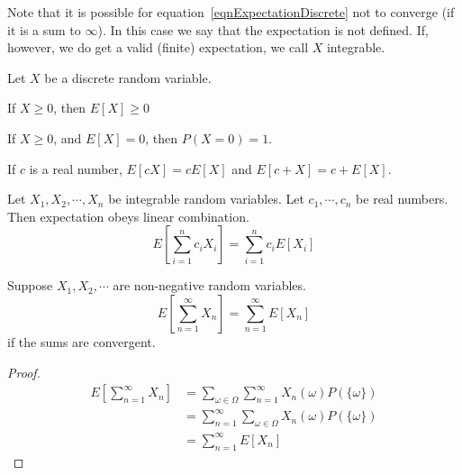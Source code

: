 \documentclass[../Main.tex]{subfiles}
\begin{document}
Note that it is possible for equation~\ref{eqnExpectationDiscrete} not to converge (if it is a sum to $\infty$). In this case we say that the expectation is not defined. If, however, we do get a valid (finite) expectation, we call $X$ integrable.
\begin{propositions}{
        Let $X$ be a discrete random variable.
        \label{propsExpectationProps}
    }
    \item If $X \geq 0$, then $E[X] \geq 0$ \label{propExpecNonNegativity}
    \item If $X \geq 0$, and $E[X] = 0$, then $P(X = 0) = 1$. \label{propExpecZero}
    \item If $c$ is a real number, $E[cX] = cE[X]$ and $E[c + X] = c + E[X]$. \label{propExpecSumProd}
    \item Let $X_1, X_2, \cdots, X_n$ be integrable random variables. Let $c_1, \cdots, c_n$ be real numbers. Then expectation obeys linear combination.
        \begin{equation*}
            E\left[\sum_{i=1}^n c_i X_i\right] = \sum_{i=1}^n c_i E[X_i]
        \end{equation*}
        \label{propExpecLinearCombo}
\end{propositions}
\begin{lemma}
    Suppose $X_1, X_2, \cdots$ are non-negative random variables.
    \begin{equation*}
        E\left[\sum_{n=1}^\infty X_n\right] = \sum_{n=1}^\infty E[X_n]
    \end{equation*}
    if the sums are convergent.
\end{lemma}
\begin{proof}
    \begin{align*}
        E\left[\sum_{n=1}^\infty X_n\right] &= \sum_{\omega \in \Omega} \sum_{n=1}^\infty X_n(\omega) P(\{\omega\}) \\
        &= \sum_{n=1}^\infty \sum_{\omega \in \Omega} X_n(\omega) P(\{\omega\}) \\
        &= \sum_{n=1}^\infty E[X_n]
    \end{align*}
\end{proof}
\end{document}

